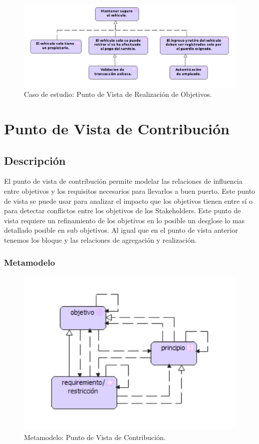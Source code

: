 \begin{figure}[h]
	\centering
	\includegraphics[width=1.0\textwidth]{imagenes/Caso_Estudio/Motivacion/Realizacion_Objetivos.PDF}
	\caption{Caso de estudio: Punto de Vista de Realización de Objetivos.}
	\label{fig:gap_analysis}
\end{figure}

\section{Punto de Vista de Contribución}
\subsection{Descripción}
El punto de vista de contribución permite modelar las relaciones de influencia entre objetivos y los requisitos necesarios para llevarlos a buen puerto. Este punto de vista se puede usar para analizar el impacto que los objetivos tienen entre sí o para detectar conflictos entre los objetivos de los Stakeholders. Este punto de vista requiere un refinamiento de los objetivos en lo posible un desglose lo mas detallado posible en sub objetivos. Al igual que en el punto de vista anterior tenemos los bloque y las relaciones de agregación y realización.

\subsubsection{Metamodelo}
\begin{figure}[h]
	\centering
	\includegraphics[width=1.0\textwidth]{imagenes/Metamodelos/Motivacion/meta_Contribucion.pdf}
	\caption{Metamodelo: Punto de Vista de Contribución.}
	\label{fig:gap_analysis}
\end{figure}

